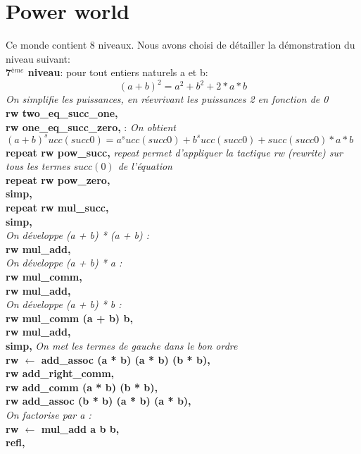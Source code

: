 \section{Power world}
Ce monde contient 8 niveaux. 
Nous avons choisi de détailler la démonstration du niveau suivant: \\
\textbf{7$^{ème}$ niveau}:
pour tout entiers naturels a et b:$$ (a+b)^2=a^2+b^2+2*a*b $$
 \textit{On simplifie les puissances, en réevrivant les puissances 2 en fonction de 0 }\\
  \textbf{rw two\_eq\_succ\_one,} \\
 \textbf{rw one\_eq\_succ\_zero,} : \textit{ On obtient $(a + b) ^ succ (succ 0) = a ^ succ (succ 0) + b ^ succ (succ 0) + succ (succ 0) * a * b$}\\
  \textbf{repeat {rw pow\_succ},} \textit{repeat permet d'appliquer la tactique rw (rewrite) sur tous les termes $succ(0)$ de l'équation} \\
  \textbf{repeat {rw pow\_zero},} \\
  \textbf{simp,} \\
  \textbf{repeat {rw mul\_succ},} \\
  \textbf{simp,} \\
  \textit{On développe (a + b) * (a + b) :} \\
 \textbf{rw mul\_add,} \\
 \textit{On développe (a + b) * a :}\\
  \textbf{rw mul\_comm,} \\
  \textbf{rw mul\_add,} \\
  \textit{On développe (a + b) * b :} \\
 \textbf{ rw mul\_comm (a + b) b,} \\
  \textbf{rw mul\_add,} \\
 \textbf{simp,}  \textit{On met les termes de gauche dans le bon ordre } \\
  \textbf{rw $\leftarrow$ add\_assoc (a * b) (a * b) (b * b),}\\
  \textbf{rw add\_right\_comm,} \\
  \textbf{rw add\_comm (a * b) (b * b),} \\
  \textbf{rw add\_assoc (b * b) (a * b) (a * b),}\\
  \textit{On factorise par a :}\\
  \textbf{rw $\leftarrow$ mul\_add a b b,}\\
  \textbf{refl,}\\
